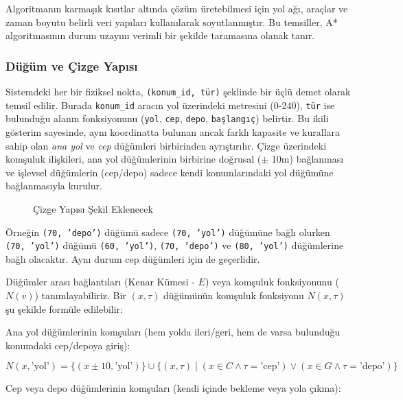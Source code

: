 Algoritmanın karmaşık kısıtlar altında çözüm üretebilmesi için yol ağı, araçlar ve zaman boyutu belirli veri yapıları kullanılarak soyutlanmıştır. Bu temsiller, A* algoritmasının durum uzayını verimli bir şekilde taramasına olanak tanır.

\subsubsection{Düğüm ve Çizge Yapısı}

Sistemdeki her bir fiziksel nokta, \texttt{(konum\_id, tür)} şeklinde bir üçlü demet olarak temsil edilir. Burada \texttt{konum\_id} aracın yol üzerindeki metresini (0-240), \texttt{tür} ise bulunduğu alanın fonksiyonunu (\texttt{yol}, \texttt{cep}, \texttt{depo}, \texttt{başlangıç}) belirtir. Bu ikili gösterim sayesinde, aynı koordinatta bulunan ancak farklı kapasite ve kurallara sahip olan \textit{ana yol} ve \textit{cep} düğümleri birbirinden ayrıştırılır. Çizge üzerindeki komşuluk ilişkileri, ana yol düğümlerinin birbirine doğrusal ($\pm$ 10m) bağlanması ve işlevsel düğümlerin (cep/depo) sadece kendi konumlarındaki yol düğümüne bağlanmasıyla kurulur.

\begin{figure}[h!]
    \centering
        \fbox{\rule{0pt}{4cm}\rule{0.7\linewidth}{0pt}}
    \caption{Çizge Yapısı Şekil Eklenecek}
    \label{fig:çizge-yapısı}
\end{figure}

Örneğin \texttt{(70, 'depo')} düğümü sadece \texttt{(70, 'yol')} düğümüne bağlı olurken \texttt{(70, 'yol')} düğümü \texttt{(60, 'yol')}, \texttt{(70, 'depo')} ve \texttt{(80, 'yol')} düğümlerine bağlı olacaktır. Aynı durum cep düğümleri için de geçerlidir.

Düğümler arası bağlantıları (Kenar Kümesi - $E$) veya komşuluk fonksiyonunu ($N(v)$) tanımlayabiliriz. Bir $(x, \tau)$ düğümünün komşuluk fonksiyonu $N(x, \tau)$ şu şekilde formüle edilebilir:

Ana yol düğümlerinin komşuları (hem yolda ileri/geri, hem de varsa bulunduğu konumdaki cep/depoya giriş):

\begin{equation}
    N(x, \text{'yol'}) = \{ (x \pm 10, \text{'yol'}) \} \cup \{ (x, \tau) \mid (x \in C \land \tau = \text{'cep'}) \lor (x \in G \land \tau = \text{'depo'}) \}
\end{equation}

Cep veya depo düğümlerinin komşuları (kendi içinde bekleme veya yola çıkma):

